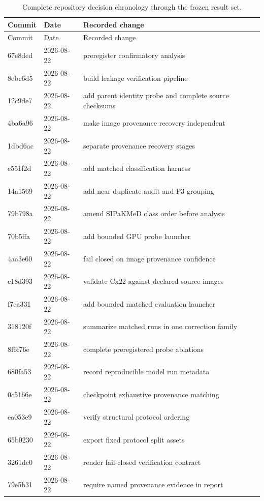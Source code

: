 \begin{longtable}{p{1.5cm}p{2.0cm}p{11.5cm}}
\caption{Complete repository decision chronology through the frozen result set.}\label{tab:git-timeline}\\
\toprule
Commit & Date & Recorded change \\
\midrule
\endfirsthead
\toprule
Commit & Date & Recorded change \\
\midrule
\endhead
\bottomrule
\endfoot
67e8ded & 2026-08-22 & preregister confirmatory analysis \\ 
8ebc6d5 & 2026-08-22 & build leakage verification pipeline \\ 
12c9de7 & 2026-08-22 & add parent identity probe and complete source checksums \\ 
4ba6a96 & 2026-08-22 & make image provenance recovery independent \\ 
1dbd6ac & 2026-08-22 & separate provenance recovery stages \\ 
c551f2d & 2026-08-22 & add matched classification harness \\ 
14a1569 & 2026-08-22 & add near duplicate audit and P3 grouping \\ 
79b798a & 2026-08-22 & amend SIPaKMeD class order before analysis \\ 
70b5ffa & 2026-08-22 & add bounded GPU probe launcher \\ 
4aa3e60 & 2026-08-22 & fail closed on image provenance confidence \\ 
c18d393 & 2026-08-22 & validate Cx22 against declared source images \\ 
f7ca331 & 2026-08-22 & add bounded matched evaluation launcher \\ 
318120f & 2026-08-22 & summarize matched runs in one correction family \\ 
8f6f76e & 2026-08-22 & complete preregistered probe ablations \\ 
680fa53 & 2026-08-22 & record reproducible model run metadata \\ 
0c5166e & 2026-08-22 & checkpoint exhaustive provenance matching \\ 
ea053e9 & 2026-08-22 & verify structural protocol ordering \\ 
65b0230 & 2026-08-22 & export fixed protocol split assets \\ 
3261dc0 & 2026-08-22 & render fail-closed verification contract \\ 
79e5b31 & 2026-08-22 & require named provenance evidence in report \\ 

\end{longtable}
